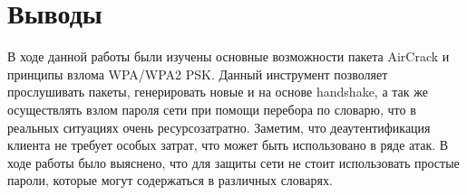 \documentclass[10pt,a4paper]{report}
\begin{document}
\section{Выводы}
В ходе данной работы были изучены основные возможности пакета AirCrack и 
принципы взлома WPA/WPA2 PSK. %
Данный инструмент позволяет прослушивать пакеты, генерировать новые и на основе 
handshake, а так же осуществлять взлом пароля сети при помощи перебора по 
словарю, что в реальных ситуациях очень ресурсозатратно. %
Заметим, что деаутентификация клиента не требует особых затрат, 
что может быть использовано в ряде атак. %
В ходе работы было выяснено, что для защиты сети не стоит использовать простые 
пароли, которые могут содержаться в различных словарях.
\end{document}
